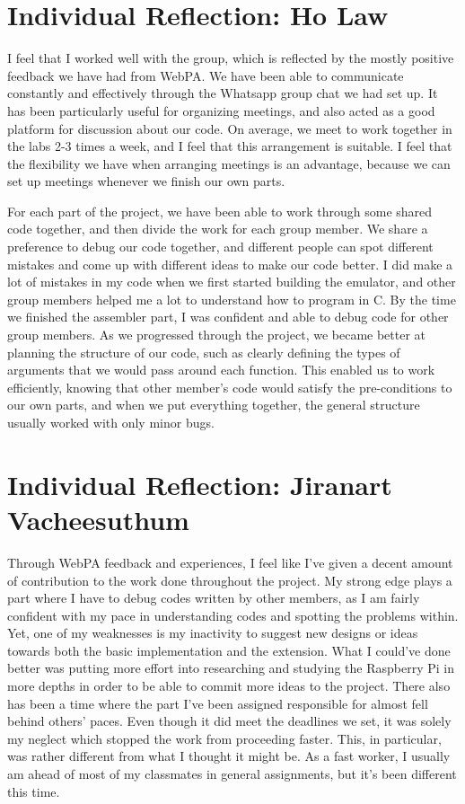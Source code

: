 \documentclass[11pt]{article}
\begin{document}
\section{Individual Reflection: Ho Law}

I feel that I worked well with the group, which is reflected by the mostly positive feedback we have had from WebPA. We have been able to communicate constantly and effectively through the Whatsapp group chat we had set up. It has been particularly useful for organizing meetings, and also acted as a good platform for discussion about our code. On average, we meet to work together in the labs 2-3 times a week, and I feel that this arrangement is suitable. I feel that the flexibility we have when arranging meetings is an advantage, because we can set up meetings whenever we finish our own parts. 

\medskip

For each part of the project, we have been able to work through some shared code together, and then divide the work for each group member. We share a preference to debug our code together, and different people can spot different mistakes and come up with different ideas to make our code better. I did make a lot of mistakes in my code when we first started building the emulator, and other group members helped me a lot to understand how to program in C. By the time we finished the assembler part, I was confident and able to debug code for other group members. As we progressed through the project, we became better at planning the structure of our code, such as clearly defining the types of arguments that we would pass around each function. This enabled us to work efficiently, knowing that other member’s code would satisfy the pre-conditions to our own parts, and when we put everything together, the general structure usually worked with only minor bugs.

\section{Individual Reflection: Jiranart Vacheesuthum}

Through WebPA feedback and experiences, I feel like I've given a decent amount of contribution to the work done throughout the project. My strong edge plays a part where I have to debug codes written by other members, as I am fairly confident with my pace in understanding codes and spotting the problems within. Yet, one of my weaknesses is my inactivity to suggest new designs or ideas towards both the basic implementation and the extension. What I could've done better was putting more effort into researching and studying the Raspberry Pi in more depths in order to be able to commit more ideas to the project.  There also has been a time where the part I've been assigned responsible for almost fell behind others' paces. Even though it did meet the deadlines we set, it was solely my neglect which stopped the work from proceeding faster. This, in particular, was rather different from what I thought it might be. As a fast worker, I usually am ahead of most of my classmates in general assignments, but it's been different this time. 
\end{document}
